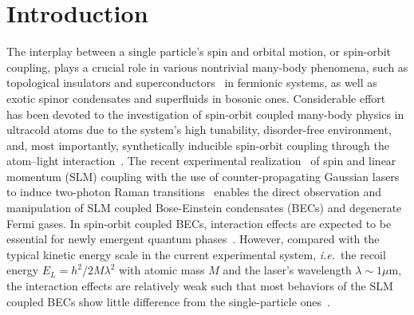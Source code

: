 \documentclass[twocolumn,pra,unsortedaddress,showpacs,floatfix,citeautoscript,nofootinbib]{revtex4-1}
\begin{document}
\section{Introduction}\label{Sec-introduction}
\vspace{-0.3cm}
The interplay between a single particle's spin and
orbital motion, or spin-orbit coupling, plays a crucial role in
various nontrivial many-body phenomena, such as topological
insulators and superconductors~\cite{Kane,Qi} in fermionic
systems, as well as exotic spinor condensates and superfluids in
bosonic ones. Considerable
effort~\cite{Lin2011,Fu2011,Pan2012,Qu2013,Ji2014,Hamner2014,Olson2014,karina2014,Campbell2015,Wang2012,Cheuk2012,Williams2013,Fu2014,Galitski2013,Zhou2013,Zhai2015,Wang2010,Wu2011,Ho2011,Zhang2012,Hu2012,Ozawa2012,Li2012,Xu2013,Zhang2013,Fetter2014,Wei2013,Gong2011,Hu2011,Yu2011,Qu13,Zhang13,Chen13,Xu2014,Lin14,Xu2014a,Jiang2014,Xu2014b}
has been devoted to the investigation of spin-orbit coupled
many-body physics in ultracold atoms due to the system's high
tunability, disorder-free environment, and, most importantly,
synthetically inducible spin-orbit coupling through the
atom--light
interaction~\cite{Spielman2009,Dalibard2011,Goldman2013}. The
recent experimental
realization~\cite{Lin2011,Fu2011,Pan2012,Qu2013,Ji2014,Hamner2014,Olson2014,karina2014,Campbell2015,Wang2012,Cheuk2012,Williams2013,Fu2014}
of spin and linear momentum (SLM) coupling with the use of
counter-propagating Gaussian lasers to induce two-photon Raman
transitions~\cite{Spielman2009} enables the direct observation and
manipulation of SLM coupled Bose-Einstein condensates (BECs) and
degenerate Fermi gases. In spin-orbit coupled BECs, interaction
effects are expected to be essential for newly emergent quantum
phases~\cite{Galitski2013}. However, compared with the typical
kinetic energy scale in the current experimental system,
\emph{i.e.}~the recoil energy $E_{L}=h^{2}/2M\lambda ^{2}$ with
atomic mass $M$ and the laser's wavelength $ \lambda \sim 1\mu$m,
the interaction effects are relatively weak such that most
behaviors of the SLM coupled BECs show little difference from the
single-particle ones~\cite{Lin2011}.
\end{document}

